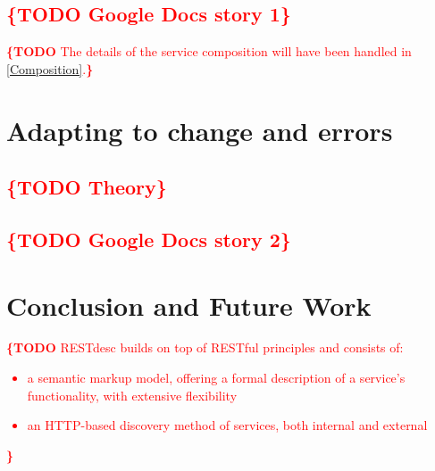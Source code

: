 \documentclass[runningheads,a4paper, twocolumn]{llncs}
\newcommand{\todo}[1]{\noindent\textcolor{red}{{\bf \{TODO} #1{\bf \}}}}
\begin{document}
\subsection{\todo{Google Docs story 1}}
\label{MainStory}
\todo{The details of the service composition will have been handled in \ref{Composition}.}

\begin{comment}
\section{Linking with external services}
\subsection{\todo{Theory}}
\subsection{\todo{Google Docs story 2}}
\end{comment}

\section{Adapting to change and errors} \label{sec:adapting-to-change-and-errors}
\subsection{\todo{Theory}}
\subsection{\todo{Google Docs story 2}}


\section{Conclusion and Future Work} \label{sec:conclusion-and-future-work}

\todo{RESTdesc builds on top of RESTful principles and consists of:
\begin{itemize}
\item a semantic markup model, offering a formal description of a service's functionality, with extensive flexibility
\item an HTTP-based discovery method of services, both internal and external
\end{itemize}
}
\end{document}
